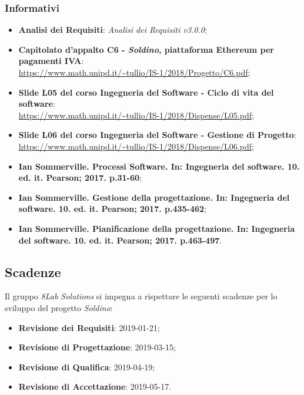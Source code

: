 \subsubsection{Informativi}
\begin{itemize}
	
	\item \textbf{Analisi dei Requisiti}:
	\textit{Analisi dei Requisiti v3.0.0};
	\item \textbf{Capitolato d'appalto C6 - \textit{Soldino}, piattaforma Ethereum per pagamenti IVA}: \\
	\url{https://www.math.unipd.it/~tullio/IS-1/2018/Progetto/C6.pdf};
	\item \textbf{Slide L05 del corso Ingegneria del Software - Ciclo di vita 
		del software}:\\
	\url{https://www.math.unipd.it/~tullio/IS-1/2018/Dispense/L05.pdf};
	\item \textbf{Slide L06 del corso Ingegneria del Software - Gestione di 
	Progetto}: \\
	\url{https://www.math.unipd.it/~tullio/IS-1/2018/Dispense/L06.pdf};
		
	\item \textbf{Ian Sommerville. Processi Software. In: Ingegneria del software.
	10. ed. it. Pearson; 2017. p.31-60};
	\item \textbf{Ian Sommerville. Gestione della progettazione. In: Ingegneria del software.
	10. ed. it. Pearson; 2017. p.435-462};
	\item \textbf{Ian Sommerville. Pianificazione della progettazione. In: Ingegneria del software.
	10. ed. it. Pearson; 2017. p.463-497}.
\end{itemize}

\hypertarget{scadenze}{\subsection{Scadenze}}
Il gruppo \textit{8Lab Solutions} si impegna a rispettare le seguenti scadenze per lo 
sviluppo del progetto \textit{Soldino}:

\begin{itemize}
	\item \textbf{Revisione dei Requisiti}: 2019-01-21;
	\item \textbf{Revisione di Progettazione}: 2019-03-15;
	\item \textbf{Revisione di Qualifica}: 2019-04-19;
	\item \textbf{Revisione di Accettazione}: 2019-05-17.
\end{itemize}